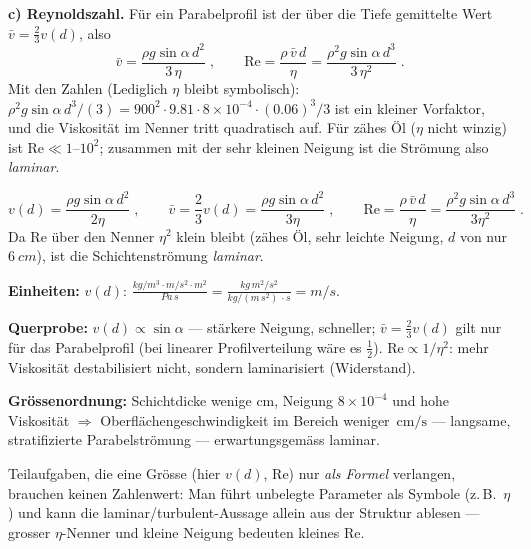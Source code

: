 \textbf{c) Reynoldszahl.} Für ein Parabelprofil ist der über die Tiefe
gemittelte Wert $\bar v=\frac23 v(d)$, also
\begin{equation}
  \bar v=\frac{\rho g\sin\alpha\, d^2}{3\,\eta}\;,\qquad
  \mathrm{Re}=\frac{\rho\,\bar v\,d}{\eta}
  =\frac{\rho^2 g\sin\alpha\, d^3}{3\,\eta^2}\;.
\end{equation}
Mit den Zahlen (Lediglich $\eta$ bleibt symbolisch):
$\rho^2 g\sin\alpha\, d^3/(3)=900^2\cdot 9.81\cdot 8\times10^{-4}
\cdot(0.06)^3/3$ ist ein kleiner Vorfaktor, und die Viskosität im Nenner
tritt quadratisch auf. Für zähes Öl ($\eta$ nicht winzig) ist
$\mathrm{Re}\ll 1$--$10^{2}$; zusammen mit der sehr kleinen Neigung ist die
Strömung also \emph{laminar}.

\begin{ergebnis}
\begin{equation*}
  v(d)=\frac{\rho g\sin\alpha\, d^2}{2\eta}\;,\qquad
  \bar v=\frac{2}{3}v(d)
  =\frac{\rho g\sin\alpha\, d^2}{3\eta}\;,\qquad
  \mathrm{Re}=\frac{\rho\,\bar v\,d}{\eta}
  =\frac{\rho^2 g\sin\alpha\, d^3}{3\eta^2}\;.
\end{equation*}
Da $\mathrm{Re}$ über den Nenner $\eta^2$ klein bleibt (zähes Öl, sehr
leichte Neigung, $d$ von nur $\qty{6}{cm}$), ist die Schichtenströmung
\emph{laminar}.
\end{ergebnis}

\begin{kontrolle}
\textbf{Einheiten:} $v(d)$:
$\frac{kg/m^3\cdot m/s^2\cdot m^2}{Pa\,s}
=\frac{kg\,m^2/s^2}{kg/(m\,s^2)\,\cdot s}=m/s$. \checkmark

\textbf{Querprobe:} $v(d)\propto\sin\alpha$ --- stärkere Neigung, schneller;
$\bar v=\frac23 v(d)$ gilt nur für das Parabelprofil (bei linearer
Profilverteilung wäre es $\frac12$). $\mathrm{Re}\propto 1/\eta^2$: mehr
Viskosität destabilisiert nicht, sondern laminarisiert (Widerstand).

\textbf{Grössenordnung:} Schichtdicke wenige cm, Neigung $8\times10^{-4}$ und
hohe Viskosität $\Rightarrow$ Oberflächengeschwindigkeit im Bereich weniger
$\,\mathrm{cm/s}$ --- langsame, stratifizierte Parabelströmung --- erwartungsgemäss laminar.
\end{kontrolle}

\begin{merksatz}
Teilaufgaben, die eine Grösse (hier $v(d)$, $\mathrm{Re}$) nur \emph{als
Formel} verlangen, brauchen keinen Zahlenwert: Man führt unbelegte Parameter
als Symbole (z.\,B.\ $\eta$) und kann die laminar/turbulent-Aussage allein
aus der Struktur ablesen --- grosser $\eta$-Nenner und kleine Neigung bedeuten
kleines $\mathrm{Re}$.
\end{merksatz}
